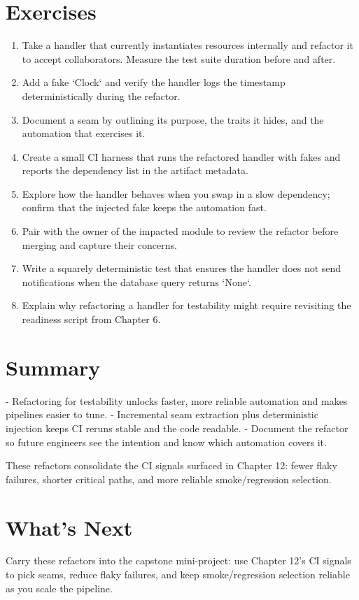 \section{Exercises}
\begin{enumerate}
  \item Take a handler that currently instantiates resources internally and refactor it to accept collaborators. Measure the test suite duration before and after.
  \item Add a fake `Clock` and verify the handler logs the timestamp deterministically during the refactor.
  \item Document a seam by outlining its purpose, the traits it hides, and the automation that exercises it.
  \item Create a small CI harness that runs the refactored handler with fakes and reports the dependency list in the artifact metadata.
  \item Explore how the handler behaves when you swap in a slow dependency; confirm that the injected fake keeps the automation fast.
  \item Pair with the owner of the impacted module to review the refactor before merging and capture their concerns.
  \item Write a squarely deterministic test that ensures the handler does not send notifications when the database query returns `None`.
  \item Explain why refactoring a handler for testability might require revisiting the readiness script from Chapter 6.
\end{enumerate}

\section{Summary}
- Refactoring for testability unlocks faster, more reliable automation and makes pipelines easier to tune.
- Incremental seam extraction plus deterministic injection keeps CI reruns stable and the code readable.
- Document the refactor so future engineers see the intention and know which automation covers it.

These refactors consolidate the CI signals surfaced in Chapter 12: fewer flaky failures, shorter critical paths, and more reliable smoke/regression selection.

\section{What's Next}
Carry these refactors into the capstone mini-project: use Chapter 12's CI signals to pick seams, reduce flaky failures, and keep smoke/regression selection reliable as you scale the pipeline.
